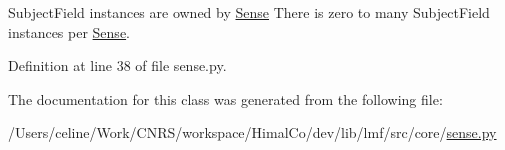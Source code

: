 Subject\+Field instances are owned by \hyperlink{classlmf_1_1src_1_1core_1_1sense_1_1_sense}{Sense} There is zero to many Subject\+Field instances per \hyperlink{classlmf_1_1src_1_1core_1_1sense_1_1_sense}{Sense}. 



Definition at line 38 of file sense.\+py.



The documentation for this class was generated from the following file\+:\begin{DoxyCompactItemize}
\item 
/\+Users/celine/\+Work/\+C\+N\+R\+S/workspace/\+Himal\+Co/dev/lib/lmf/src/core/\hyperlink{sense_8py}{sense.\+py}\end{DoxyCompactItemize}
